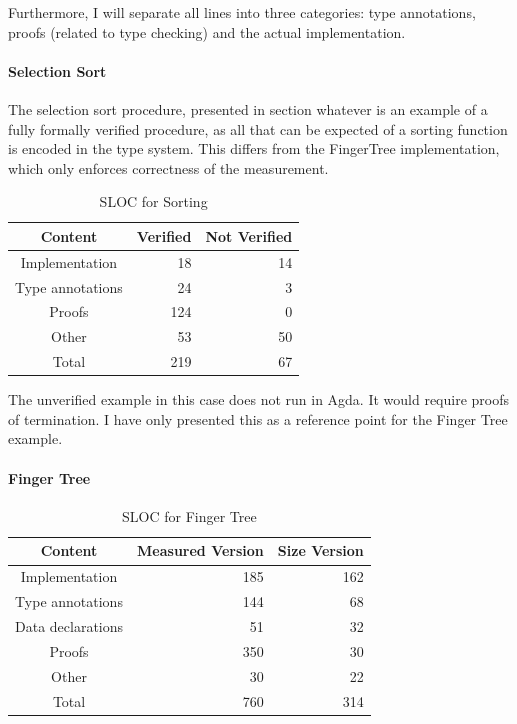 \documentclass[12pt,twoside,notitlepage]{report}
\begin{document}
Furthermore, I will separate all lines into three categories: type annotations, proofs (related to type checking) and the actual implementation.

\paragraph{Selection Sort}

The selection sort procedure, presented in section whatever is an example of a fully formally verified procedure, as all that can be expected of a sorting function is encoded in the type system. This differs from the FingerTree implementation, which only enforces correctness of the measurement.

\begin{table}[H]
\caption{SLOC for Sorting}
\center
\begin{tabular}{c r r}
\hline
Content & Verified & Not Verified\\
\hline
Implementation & 18 & 14 \\
Type annotations & 24 & 3 \\
Proofs & 124 & 0 \\
Other & 53 & 50 \\
Total & 219 & 67 \\
\hline
\end{tabular} 
\end{table}

The unverified example in this case does not run in Agda. It would require proofs of termination. I have only presented this as a reference point for the Finger Tree example.

\paragraph{Finger Tree}

\begin{table}[H]
\caption{SLOC for Finger Tree}
\center
\begin{tabular}{c r r}
\hline 
Content & Measured Version & Size Version \\
\hline
Implementation & 185 & 162 \\ 
Type annotations & 144 & 68 \\
Data declarations & 51 & 32 \\
Proofs & 350 & 30 \\
Other & 30 & 22 \\ 
Total & 760 & 314 \\
\hline
\end{tabular}
\end{table} 
\end{document}
